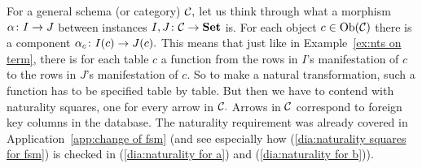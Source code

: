 \documentclass[CT4S-EN-RU]{subfiles}
\begin{document}
\begin{exerciseRUS}\label{exc:indexed sets as functors}
\end{exerciseRUS}

\begin{blockENG}
For a general schema (or category) $\mathcal{C},$ let us think through what a morphism $\alpha\colon I\rightarrow J$ between instances $I,J\colon\mathcal{C}\rightarrow{\mathbf{Set}}$ is. For each object $c\in\textnormal{Ob}(\mathcal{C})$ there is a component $\alpha_c\colon I(c)\rightarrow J(c).$ This means that just like in Example~\ref{ex:nts on term}, there is for each table $c$ a function from the rows in $I$'s manifestation of $c$ to the rows in $J$'s manifestation of $c.$ So to make a natural transformation, such a function has to be specified table by table. But then we have to contend with naturality squares, one for every arrow in $\mathcal{C}.$ Arrows in $\mathcal{C}$ correspond to foreign key columns in the database. The naturality requirement was already covered in Application~\ref{app:change of fsm} (and see especially how (\ref{dia:naturality squares for fsm}) is checked in (\ref{dia:naturality for a}) and (\ref{dia:naturality for b})).
\end{blockENG}

\begin{blockRUS}
\end{blockRUS}
\end{document}

